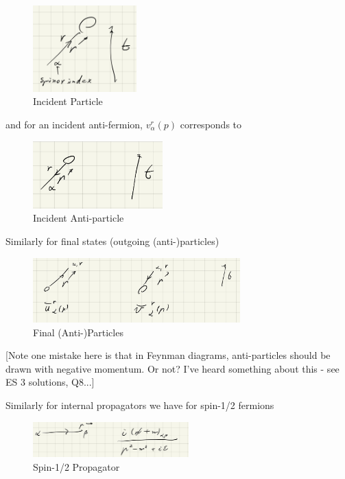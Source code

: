 \documentclass{article}
\theoremstyle{definition}
\begin{document}
\begin{figure}[H]
  \centering
  \includegraphics[width=4cm]{res/QFT/feynman_incident_particle}
  \caption{Incident Particle}
  \label{feynman_incident_particle}
\end{figure}

and for an incident anti-fermion, $v_\alpha^r(p)$ corresponds to

\begin{figure}[H]
  \centering
  \includegraphics[width=5cm]{res/QFT/feynman_incident_anti-particle}
  \caption{Incident Anti-particle}
  \label{feynman_incident_anti-particle}
\end{figure}

Similarly for final states (outgoing (anti-)particles)

\begin{figure}[H]
\centering
\includegraphics[width=8cm]{res/QFT/feynman_final_particles}
\caption{Final (Anti-)Particles}
\label{feynman_final_particles}
\end{figure}

[Note one mistake here is that in Feynman diagrams, anti-particles should be
drawn with negative momentum. Or not? I've heard something about this - see ES 3
solutions, Q8...]

Similarly for internal propagators we have for spin-1/2 fermions

\begin{figure}[H]
\centering
\includegraphics[width=6cm]{res/QFT/feynman_vector_propagator}
\caption{Spin-1/2 Propagator}
\label{feynman_vector_propagator}
\end{figure}
\end{document}
